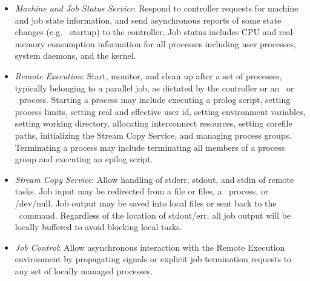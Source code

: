 \begin{itemize}
\item {\em Machine and Job Status Service}:  Respond to controller 
requests for machine and job state information, and send asynchronous 
reports of some state changes (e.g. \slurmd\ startup) to the controller.
Job status includes CPU and real-memory consumption information for all 
processes including user processes, system daemons, and the kernel. 

\item {\em Remote Execution}: Start, monitor, and clean up after a set
of processes, typically belonging to a parallel job, as dictated by the
controller or an \srun\ or \scancel\ process. Starting a process may
include executing a prolog script, setting process limits, setting real
and effective user id, setting environment variables, setting working
directory, allocating interconnect resources, setting corefile paths,
initializing the Stream Copy Service, and managing
process groups. Terminating a process may include terminating all members
of a process group and executing an epilog script.

\item {\em Stream Copy Service}: Allow handling of stderr, stdout, and
stdin of remote tasks. Job input may be redirected from a file or files, a
\srun\ process, or /dev/null.  Job output may be saved into local files or
sent back to the \srun\ command. Regardless of the location of stdout/err,
all job output will be locally buffered to avoid blocking local tasks.

\item {\em Job Control}: Allow asynchronous interaction with the
Remote Execution environment by propagating signals or explicit job
termination requests to any set of locally managed processes.

%
%
\end{itemize}

